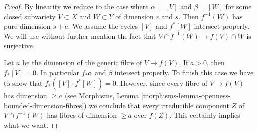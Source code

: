 \begin{proof}
By linearity we reduce to the case where $\alpha = [V]$ and
$\beta = [W]$ for some closed subvariety $V \subset X$ and
$W \subset Y$ of dimension $r$ and $s$. Then $f^{-1}(W)$ has
pure dimension $s + e$. We assume the cycles
$[V]$ and $f^*[W]$ intersect properly. We will use without
further mention the fact that $V \cap f^{-1}(W) \to f(V) \cap W$
is surjective.

\medskip\noindent
Let $a$ be the dimension of the generic fibre of $V \to f(V)$.
If $a > 0$, then $f_*[V] = 0$. In particular $f_*\alpha$ and $\beta$
intersect properly. To finish this case we have to show that
$f_*([V] \cdot f^*[W]) = 0$. However, since every fibre of
$V \to f(V)$ has dimension $\geq a$ (see
Morphisms, Lemma \ref{morphisms-lemma-openness-bounded-dimension-fibres})
we conclude that every irreducible component $Z$ of $V \cap f^{-1}(W)$
has fibres of dimension $\geq a$ over $f(Z)$. This certainly
implies what we want.


\end{proof}
